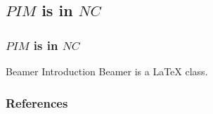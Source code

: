 \documentclass[article,8pt]{beamer}%
\begin{document}
\subsection{$PIM$ is in $NC$}
\begin{frame}
\frametitle{$PIM$ is in $NC$}

\begin{block}{Beamer Introduction}
Beamer is a { \LaTeX} class.
\end{block}

\end{frame}


\begin{frame}[allowframebreaks]
\frametitle{References}
\printbibliography
\end{frame}
\end{document}
